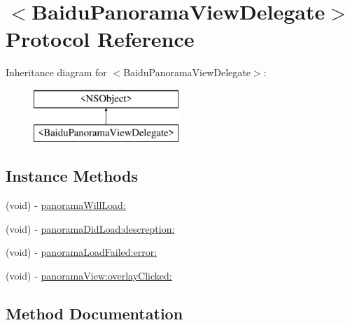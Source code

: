 \hypertarget{protocol_baidu_panorama_view_delegate-p}{}\section{$<$Baidu\+Panorama\+View\+Delegate$>$ Protocol Reference}
\label{protocol_baidu_panorama_view_delegate-p}
Inheritance diagram for $<$Baidu\+Panorama\+View\+Delegate$>$\+:\begin{figure}[H]
\begin{center}
\leavevmode
\includegraphics[height=2.000000cm]{protocol_baidu_panorama_view_delegate-p}
\end{center}
\end{figure}
\subsection*{Instance Methods}
\begin{DoxyCompactItemize}
\item 
(void) -\/ \hyperlink{protocol_baidu_panorama_view_delegate-p_a03539810d751c9ba222b787f77220634}{panorama\+Will\+Load\+:}
\item 
(void) -\/ \hyperlink{protocol_baidu_panorama_view_delegate-p_a24f54de59de8a2cdb3ee4671c1f79d73}{panorama\+Did\+Load\+:descreption\+:}
\item 
(void) -\/ \hyperlink{protocol_baidu_panorama_view_delegate-p_a4078254b3540500fc14b2f718ede1142}{panorama\+Load\+Failed\+:error\+:}
\item 
(void) -\/ \hyperlink{protocol_baidu_panorama_view_delegate-p_af45938530cd3b0e4c0309785c339af17}{panorama\+View\+:overlay\+Clicked\+:}
\end{DoxyCompactItemize}


\subsection{Method Documentation}
\hypertarget{protocol_baidu_panorama_view_delegate-p_a24f54de59de8a2cdb3ee4671c1f79d73}{}

